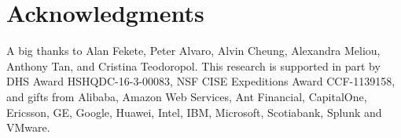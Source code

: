 \section{Acknowledgments}
A big thanks to Alan Fekete, Peter Alvaro, Alvin Cheung, Alexandra Meliou,
Anthony Tan, and Cristina Teodoropol.
%
This research is supported in part by DHS Award HSHQDC-16-3-00083, NSF CISE
Expeditions Award CCF-1139158, and gifts from Alibaba, Amazon Web Services, Ant
Financial, CapitalOne, Ericsson, GE, Google, Huawei, Intel, IBM, Microsoft,
Scotiabank, Splunk and VMware.
